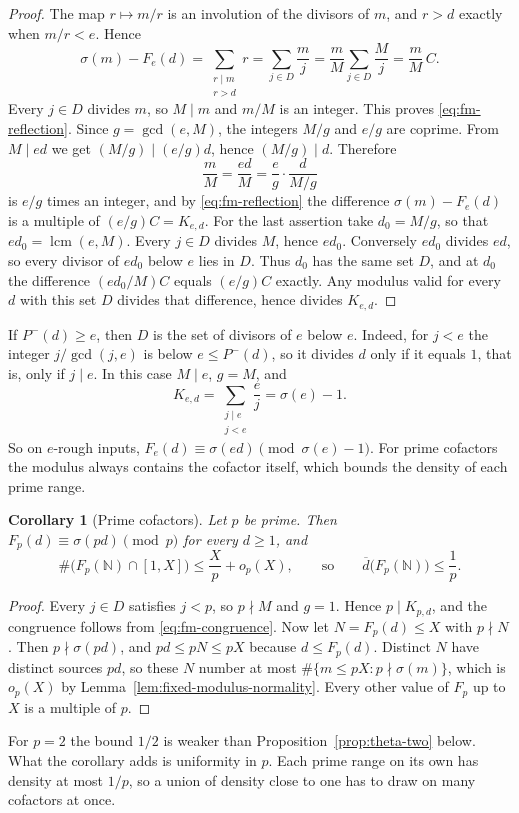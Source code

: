 \documentclass[11pt]{article}
\newtheorem{corollary}[theorem]{Corollary}
\theoremstyle{remark}
\newcommand{\N}{\mathbb N}
\newcommand{\1}{\mathbf 1}
\newcommand{\upperdens}{\overline d}
\DeclareMathOperator{\lcm}{lcm}
\begin{document}
\begin{proof}
The map $r\mapsto m/r$ is an involution of the divisors of $m$, and $r>d$
exactly when $m/r<e$.  Hence
\[
 \sigma(m)-F_e(d)=\sum_{\substack{r\mid m\\ r>d}}r
 =\sum_{j\in D}\frac mj=\frac mM\sum_{j\in D}\frac Mj=\frac mM\,C .
\]
Every $j\in D$ divides $m$, so $M\mid m$ and $m/M$ is an integer.  This
proves \eqref{eq:fm-reflection}.
Since $g=\gcd(e,M)$, the integers $M/g$ and $e/g$ are coprime.  From
$M\mid ed$ we get $(M/g)\mid(e/g)d$, hence $(M/g)\mid d$.  Therefore
\[
 \frac mM=\frac{ed}M=\frac eg\cdot\frac d{M/g}
\]
is $e/g$ times an integer, and by \eqref{eq:fm-reflection} the difference
$\sigma(m)-F_e(d)$ is a multiple of $(e/g)C=K_{e,d}$.
For the last assertion take $d_0=M/g$, so that $ed_0=\lcm(e,M)$.  Every
$j\in D$ divides $M$, hence $ed_0$.  Conversely $ed_0$ divides $ed$, so
every divisor of $ed_0$ below $e$ lies in $D$.  Thus $d_0$ has the same set
$D$, and at $d_0$ the difference $(ed_0/M)C$ equals $(e/g)C$ exactly.  Any
modulus valid for every $d$ with this set $D$ divides that difference,
hence divides $K_{e,d}$.
\end{proof}
If $P^-(d)\geq e$, then $D$ is the set of divisors of $e$ below $e$.
Indeed, for $j<e$ the integer $j/\gcd(j,e)$ is below $e\leq P^-(d)$, so it
divides $d$ only if it equals $1$, that is, only if $j\mid e$.  In this
case $M\mid e$, $g=M$, and
\[
 K_{e,d}=\sum_{\substack{j\mid e\\ j<e}}\frac ej=\sigma(e)-1 .
\]
So on $e$-rough inputs, $F_e(d)\equiv\sigma(ed)\pmod{\sigma(e)-1}$.
For prime cofactors the modulus always contains the cofactor itself, which
bounds the density of each prime range.
\begin{corollary}[Prime cofactors]\label{cor:fm-prime-ceiling}
Let $p$ be prime.  Then $F_p(d)\equiv\sigma(pd)\pmod p$ for every $d\geq1$,
and
\[
 \#\bigl(F_p(\N)\cap[1,X]\bigr)\leq\frac Xp+o_p(X),
 \qquad\text{so}\qquad
 \upperdens\bigl(F_p(\N)\bigr)\leq\frac1p .
\]
\end{corollary}
\begin{proof}
Every $j\in D$ satisfies $j<p$, so $p\nmid M$ and $g=1$.  Hence
$p\mid K_{p,d}$, and the congruence follows from \eqref{eq:fm-congruence}.
Now let $N=F_p(d)\leq X$ with $p\nmid N$.  Then $p\nmid\sigma(pd)$, and
$pd\leq pN\leq pX$ because $d\leq F_p(d)$.  Distinct $N$ have distinct
sources $pd$, so these $N$ number at most
$\#\{m\leq pX:p\nmid\sigma(m)\}$, which is $o_p(X)$ by
Lemma~\ref{lem:fixed-modulus-normality}.  Every other value of $F_p$ up to
$X$ is a multiple of $p$.
\end{proof}
For $p=2$ the bound $1/2$ is weaker than Proposition~\ref{prop:theta-two}
below.  What the corollary adds is uniformity in $p$.  Each prime range on
its own has density at most $1/p$, so a union of density close to one has
to draw on many cofactors at once.
\end{document}
